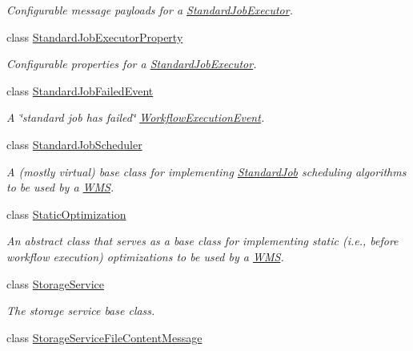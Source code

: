\begin{DoxyCompactItemize}
\begin{DoxyCompactList}\small\item\em Configurable message payloads for a \hyperlink{classwrench_1_1_standard_job_executor}{Standard\+Job\+Executor}. \end{DoxyCompactList}\item 
class \hyperlink{classwrench_1_1_standard_job_executor_property}{Standard\+Job\+Executor\+Property}
\begin{DoxyCompactList}\small\item\em Configurable properties for a \hyperlink{classwrench_1_1_standard_job_executor}{Standard\+Job\+Executor}. \end{DoxyCompactList}\item 
class \hyperlink{classwrench_1_1_standard_job_failed_event}{Standard\+Job\+Failed\+Event}
\begin{DoxyCompactList}\small\item\em A \char`\"{}standard job has failed\char`\"{} \hyperlink{classwrench_1_1_workflow_execution_event}{Workflow\+Execution\+Event}. \end{DoxyCompactList}\item 
class \hyperlink{classwrench_1_1_standard_job_scheduler}{Standard\+Job\+Scheduler}
\begin{DoxyCompactList}\small\item\em A (mostly virtual) base class for implementing \hyperlink{classwrench_1_1_standard_job}{Standard\+Job} scheduling algorithms to be used by a \hyperlink{classwrench_1_1_w_m_s}{W\+MS}. \end{DoxyCompactList}\item 
class \hyperlink{classwrench_1_1_static_optimization}{Static\+Optimization}
\begin{DoxyCompactList}\small\item\em An abstract class that serves as a base class for implementing static (i.\+e., before workflow execution) optimizations to be used by a \hyperlink{classwrench_1_1_w_m_s}{W\+MS}. \end{DoxyCompactList}\item 
class \hyperlink{classwrench_1_1_storage_service}{Storage\+Service}
\begin{DoxyCompactList}\small\item\em The storage service base class. \end{DoxyCompactList}\item 
class \hyperlink{classwrench_1_1_storage_service_file_content_message}{Storage\+Service\+File\+Content\+Message}

\end{DoxyCompactItemize}
